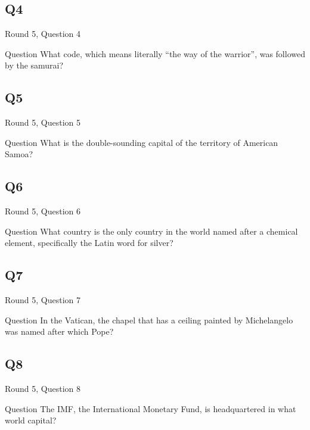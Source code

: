 \documentclass[11pt]{beamer}
\begin{document}
\subsection*{Q4}
\begin{frame}[t]{Round 5, Question 4}
\vspace{2em}
\begin{block}{Question}
What code, which means literally ``the way of the warrior'', was followed by the samurai\@?
\end{block}
\end{frame}
    

\subsection*{Q5}
\begin{frame}[t]{Round 5, Question 5}
\vspace{2em}
\begin{block}{Question}
What is the double-sounding capital of the territory of American Samoa\@?
\end{block}
\end{frame}
    

\subsection*{Q6}
\begin{frame}[t]{Round 5, Question 6}
\vspace{2em}
\begin{block}{Question}
What country is the only country in the world named after a chemical element, specifically the Latin word for silver\@?
\end{block}
\end{frame}
    

\subsection*{Q7}
\begin{frame}[t]{Round 5, Question 7}
\vspace{2em}
\begin{block}{Question}
In the Vatican, the chapel that has a ceiling painted by Michelangelo was named after which Pope\@?
\end{block}
\end{frame}
    

\subsection*{Q8}
\begin{frame}[t]{Round 5, Question 8}
\vspace{2em}
\begin{block}{Question}
The IMF, the International Monetary Fund, is headquartered in what world capital\@?
\end{block}
\end{frame}
    
\end{document}
